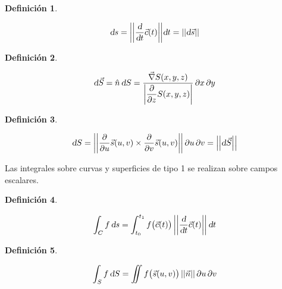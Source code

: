 \documentclass[a5paper,12pt,twoside]{book}
\newtheorem{defn}{{Definición}}[chapter]
\begin{document}
\begin{mdframed}[style=DefinitionFrame]
    \begin{defn}
    \end{defn}
    \begin{equation*}
        \textsl{d} s = {\left|\left| { \dfrac{\textsl{d}}{\textsl{d} t} \Vec{c}(t) } \right|\right|} \textsl{d} t = {\left|\left| { \textsl{d} \Vec{s} } \right|\right|}
    \end{equation*}
\end{mdframed}

\begin{mdframed}[style=DefinitionFrame]
    \begin{defn}
    \end{defn}
    \begin{equation*}
        \textsl{d} \Vec{S} = \hat{n} \, \textsl{d} S = \dfrac{\Vec{\nabla} S(x,y,z)}{{\left| { \dfrac{\partial}{\partial z} S(x,y,z) } \right|} } \, \partial x \, \partial y
    \end{equation*}
\end{mdframed}

\begin{mdframed}[style=DefinitionFrame]
    \begin{defn}
    \end{defn}
    \begin{equation*}
        \textsl{d} S = {\left|\left| { \dfrac{\partial}{\partial u} \Vec{s}(u,v) \times \dfrac{\partial}{\partial v} \Vec{s}(u,v) } \right|\right|} \, \partial u \, \partial v = {\left|\left| { \textsl{d} \Vec{S} } \right|\right|}
    \end{equation*}
\end{mdframed}



Las integrales sobre curvas y superficies de tipo 1 se realizan sobre campos escalares.

\begin{mdframed}[style=DefinitionFrame]
    \begin{defn}
    \end{defn}
    \begin{equation*}
        \int_C f \, \textsl{d} s = \int_{t_0}^{t_1} f \big( \Vec{c}(t) \big) \, {\left|\left| { \dfrac{\textsl{d}}{\textsl{d} t} \Vec{c}(t) } \right|\right|} \, \textsl{d} t
    \end{equation*}
\end{mdframed}

\begin{mdframed}[style=DefinitionFrame]
    \begin{defn}
    \end{defn}
    \begin{equation*}
        \int_S f \, \textsl{d} S = \iint f \big( \Vec{s}(u,v) \big) \, {\left|\left| { \Vec{n} } \right|\right|} \, \partial u \, \partial v
    \end{equation*}
\end{mdframed}
\end{document}
